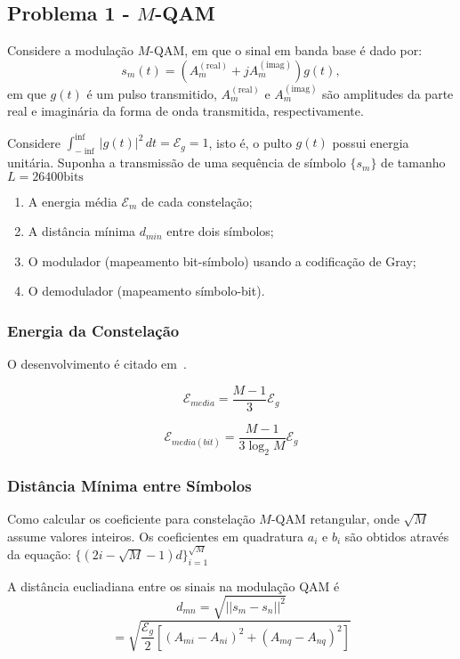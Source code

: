 \subsection{Problema 1 - \texorpdfstring{$M$}{M}-QAM}

Considere a modulação $M$-QAM, em que o sinal em banda base é dado por:
$$s_m(t) = ( A_m^{(\text{real})} + j A_m^{(\text{imag})}) g(t) ,$$
em que $g(t)$ é um pulso transmitido, $A_m^{(\text{real})}$ e $A_m^{(\text{imag})}$ são amplitudes da parte real e imaginária da forma de onda transmitida, respectivamente.

Considere $\int_{-\inf}^{\inf} |g(t)|^2 \,dt = \mathcal{E}_{g} = 1$, isto é, o pulto $g(t)$ possui energia unitária. Suponha a transmissão de uma sequência de símbolo $\{s_{m}\}$ de tamanho $L = 26400 \text{bits}$
\begin{enumerate}
    \item A energia média $\mathcal{E}_{m}$ de cada constelação;
    \item A distância mínima $d_{min}$ entre dois símbolos;
    \item O modulador (mapeamento bit-símbolo) usando a codificação de Gray;
    \item O demodulador (mapeamento símbolo-bit).
\end{enumerate}


\subsubsection{Energia da Constelação} 

O desenvolvimento é citado em~\cite{Proakis, Cecilio}.

$$ \mathcal{E}_{media} = \frac{M-1}{3} \mathcal{E}_g$$

$$ \mathcal{E}_{media(bit)} = \frac{M-1}{3\log_2 M} \mathcal{E}_g $$
\subsubsection{Distância Mínima entre Símbolos}

Como calcular os coeficiente para constelação $M$-QAM retangular, onde $\sqrt{M}$ assume valores inteiros. Os coeficientes em quadratura $a_i$ e $b_i$ são obtidos através da equação: $\{ (2i -\sqrt{M} - 1)d \}_{i=1}^{\sqrt{M}} $ 

A distância eucliadiana entre os sinais na modulação QAM é
$$ d_{mn} = \sqrt{|| s_m - s_n||^2}$$ 
$$ = \sqrt{\frac{\mathcal{E}_g}{2}[(A_{mi} - A_{ni})^2 + (A_{mq} - A_{nq})^2]}$$

